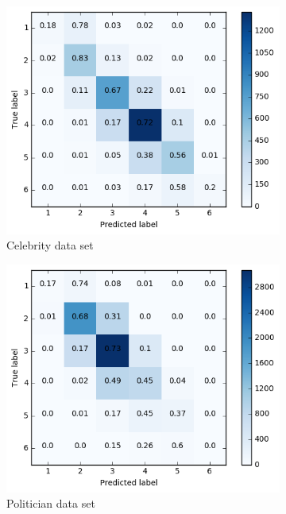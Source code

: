 \begin{figure}[h]
\centering
\begin{subfigure}{.5\textwidth}
  \centering
  \includegraphics[width=.95\linewidth]{img/celeb_d1_cm_retweets}
  \caption{Celebrity data set}
  \label{fig:retw_distr_sub1}
\end{subfigure}%
\begin{subfigure}{.5\textwidth}
  \centering
  \includegraphics[width=.95\linewidth]{img/polit_d1_cm_retweets}
  \caption{Politician data set}
  \label{fig:retw_distr_sub2}
\end{subfigure}
\begin{subfigure}{.5\textwidth}

\end{subfigure}
\end{figure}
